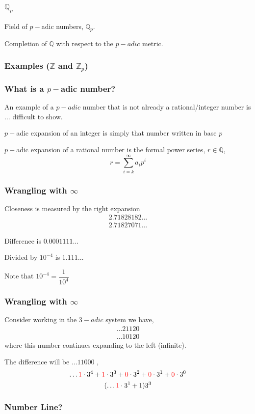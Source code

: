 \documentclass{beamer}
\newcommand{\zz}{\mathbb Z}   %
\newcommand{\qq}{\mathbb Q}   %
\newcommand{\tcr}[1]{\textcolor{red}{#1}}
\begin{document}
    \begin{frame}
        \frametitle{$\qq_p$}
        Field of $p-$adic numbers, $\qq_p$. \pause

        Completion of $\qq$ with respect to the $p-adic$ metric. \pause

        
    \end{frame}

    \begin{frame}
        \frametitle{Examples ($\zz$ and $\zz_p$)}
    \end{frame}

    \begin{frame}
        \frametitle{What is a $p-$adic number?}
        An example of a $p-adic$ number that is not  already a rational/integer number is $\dots$ \pause difficult to show.  \pause

        $p-$adic expansion of an integer is simply that number written in base $p$ \pause
        
        $p-$adic expansion of a rational number is the formal power series, $r \in \qq$,
        \[r = \sum_{i=k}^{\infty}a_ip^{i}\]

    \end{frame}

    \begin{frame}
        \frametitle{Wrangling with $\infty$}
        Closeness is measured by the right expansion\pause
        \begin{align*}
            2.71828182\dots \\
            2.71827071\dots
        \end{align*} \pause

        Difference is $0.0001111\dots$ \pause

        Divided by $10^{-4}$ is $1.111\dots$ \pause

        Note that $10^{-4} = \dfrac{1}{10^{4}}$


        
    
    \end{frame}
    \begin{frame}
        \frametitle{Wrangling with $\infty$}
        Consider working in the $3-adic$ system we have,
        \begin{align*}
            \dots 21120 \\
            \dots 10120 
        \end{align*}    
        where this number continues expanding to the left (infinite). \pause
        
        The difference will be $\dots 11000$ \pause,
        \[\dots \tcr{1}\cdot 3^{4} + \tcr{1} \cdot 3^{3} + \tcr{0}\cdot 3^{2} + \tcr{0}\cdot 3^{1} + \tcr{0}\cdot 3^{0}\] \pause
        \[(\dots \tcr{1}\cdot 3^{1} + 1)3^{3}\]
    
    \end{frame}
    \begin{frame}   
        \frametitle{Number Line?}


    \end{frame}
\end{document}
